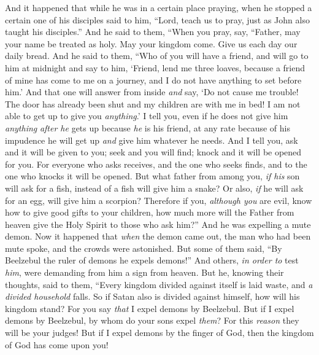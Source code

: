 \begin{biblechapter} %
 And it happened that while he was in a certain place praying, when he stopped a certain one of his disciples said to him, “Lord, teach us to pray, just as John also taught his disciples.”
\verse And he said to them, “When you pray, say,
\verse “Father, 
may your name be treated as holy. 
May your kingdom come.
\verse Give us each day our daily bread.
 And he said to them, “Who of you will have a friend, and will go to him at midnight and say to him, ‘Friend, lend me three loaves,
\verse because a friend of mine has come to me on a journey, and I do not have anything to set before him.’
\verse And that one will answer from inside \textit{and} say, ‘Do not cause me trouble! The door has already been shut and my children are with me in bed! I am not able to get up to give you \textit{anything}.’
\verse I tell you, even if he does not give him \textit{anything} \textit{after he} gets up because \textit{he} is his friend, at any rate because of his impudence he will get up \textit{and} give him whatever he needs.
\verse And I tell you, ask and it will be given to you; seek and you will find; knock and it will be opened for you.
\verse For everyone who asks receives, and the one who seeks finds, and to the one who knocks it will be opened.
\verse But what father from among you, \textit{if his} son will ask for a fish, instead of a fish will give him a snake?
\verse Or also, \textit{if} he will ask for an egg, will give him a scorpion?
\verse Therefore if you, \textit{although you} are evil, know how to give good gifts to your children, how much more will the Father from heaven give the Holy Spirit to those who ask him?”
 And he was expelling a mute demon. Now it happened that \textit{when} the demon came out, the man who had been mute spoke, and the crowds were astonished.
\verse But some of them said, “By Beelzebul the ruler of demons he expels demons!”
\verse And others, \textit{in order to} test \textit{him}, were demanding from him a sign from heaven.
\verse But he, knowing their thoughts, said to them, “Every kingdom divided against itself is laid waste, and \textit{a divided household} falls.
\verse So if Satan also is divided against himself, how will his kingdom stand? For you say \textit{that} I expel demons by Beelzebul.
\verse But if I expel demons by Beelzebul, by whom do your sons expel \textit{them}? For this \textit{reason} they will be your judges!
\verse But if I expel demons by the finger of God, then the kingdom of God has come upon you!

\end{biblechapter}
